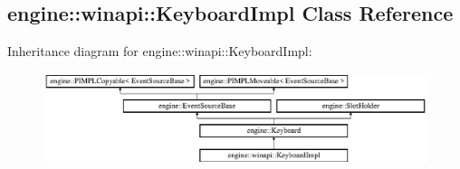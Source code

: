 \hypertarget{a00056}{}\subsection{engine\+:\+:winapi\+:\+:Keyboard\+Impl Class Reference}
\label{a00056}
Inheritance diagram for engine\+:\+:winapi\+:\+:Keyboard\+Impl\+:\begin{figure}[H]
\begin{center}
\leavevmode
\includegraphics[height=2.647754cm]{a00056}
\end{center}
\end{figure}
